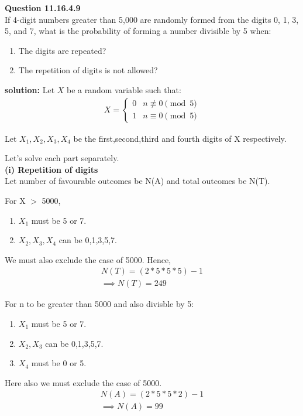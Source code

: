 \documentclass{article}
\begin{document}
\providecommand{\pr}[1]{\ensuremath{\Pr\left(#1\right)}}
\providecommand{\brak}[1]{\ensuremath{\left(#1\right)}}
\newcommand{\solution}{\noindent \textbf{solution: }}

\textbf{Question 11.16.4.9}\\
If 4-digit numbers greater than 5,000 are randomly formed from the digits 0, 1, 3, 5, and 7, what is the probability of forming a number divisible by 5 when:
\begin{enumerate}
    \item The digits are repeated?
    \item The repetition of digits is not allowed?
\end{enumerate}

\solution
Let $X$ be a random variable such that:
\begin{align}
	X = \begin{cases}
		0 & n \not\equiv 0 \pmod{5}\\
		1 & n \equiv 0 \pmod{5}\end{cases}
\end{align}

Let $X_{1},X_{2},X_{3},X_{4}$ be the first,second,third and fourth digits of X respectively.

Let's solve each part separately. \\

\textbf{(i) Repetition of digits}\\
Let number of favourable outcomes be N(A) and total outcomes be N(T).

For X $>$ 5000,
\begin{enumerate}
	\item $X_{1}$ must be 5 or 7.
	\item $X_{2},X_{3},X_{4}$ can be 0,1,3,5,7.
\end{enumerate}
We must also exclude the case of 5000.
Hence,
\begin{align}
	N(T)=(2*5*5*5)-1 \\
	\implies N(T)=249
\end{align}

For n to be greater than 5000 and also divisble by 5:
\begin{enumerate}
	\item $X_{1}$ must be 5 or 7.
	\item $X_{2},X_{3}$ can be 0,1,3,5,7.
	\item $X_{4}$ must be 0 or 5.
\end{enumerate}
Here also we must exclude the case of 5000.
\begin{align}
	N(A)=(2*5*5*2)-1 \\
	\implies N(A)=99
\end{align}
\end{document}
